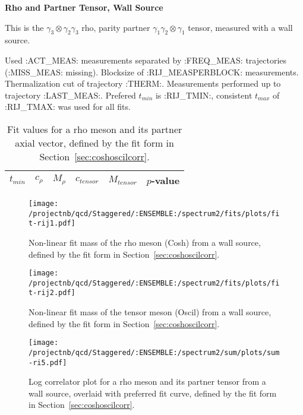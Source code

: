 \clearpage

\centerline{\textbf{Rho and Partner Tensor, Wall Source}}

This is the $\gamma_3 \otimes \gamma_2 \gamma_3$ rho, parity partner $\gamma_1 \gamma_2 \otimes \gamma_1$ tensor, measured with a wall source.

{\small{Used :ACT_MEAS: measurements separated by :FREQ_MEAS: trajectories (:MISS_MEAS: missing). Blocksize of :RIJ_MEASPERBLOCK: measurements. Thermalization cut of trajectory :THERM:. Measurements performed up to trajectory :LAST_MEAS:. Prefered $t_{min}$ is :RIJ_TMIN:, consistent $t_{max}$ of :RIJ_TMAX: was used for all fits.}}


\begin{table}[ht!]
\centering
\scriptsize
\begin{tabular}{|c|c|c|c|c|c|}
\hline
 $t_{min}$ & $c_{\rho}$ &  $M_{\rho}$ & $c_{tensor}$ & $M_{tensor}$ & $p$-value \\
\hline

\end{tabular}
\caption{Fit values for a rho meson and its partner axial vector, defined by the fit form in Section~\ref{sec:coshoscilcorr}.}
\end{table}

\begin{multicols}{2}
\begin{figure}[H]
\centering
\texttt{[image: /projectnb/qcd/Staggered/:ENSEMBLE:/spectrum2/fits/plots/fit-rij1.pdf]}
\caption{Non-linear fit mass of the rho meson (Cosh) from a wall source, defined by the fit form in Section~\ref{sec:coshoscilcorr}.}
\end{figure}
\columnbreak
\begin{figure}[H]
\centering
\texttt{[image: /projectnb/qcd/Staggered/:ENSEMBLE:/spectrum2/fits/plots/fit-rij2.pdf]}
\caption{Non-linear fit mass of the tensor meson (Oscil) from a wall source, defined by the fit form in Section~\ref{sec:coshoscilcorr}.}
\end{figure}
\end{multicols}

\begin{figure}[H]
\centering
\texttt{[image: /projectnb/qcd/Staggered/:ENSEMBLE:/spectrum2/sum/plots/sum-ri5.pdf]}
\caption{Log correlator plot for a rho meson and its partner tensor from a wall source, overlaid with preferred fit curve, defined by the fit form in Section~\ref{sec:coshoscilcorr}.}
\end{figure}


